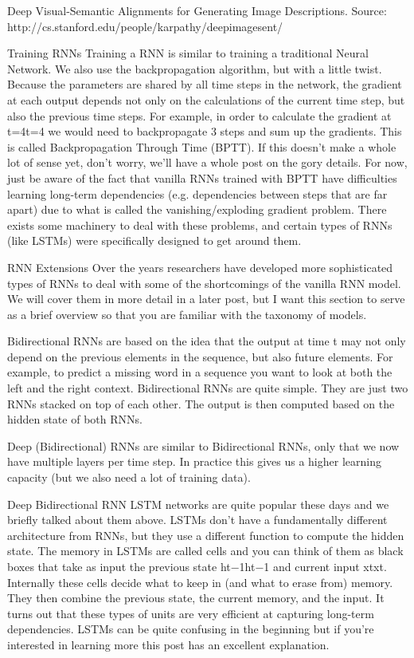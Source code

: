 Deep Visual-Semantic Alignments for Generating Image Descriptions. Source: http://cs.stanford.edu/people/karpathy/deepimagesent/

Training RNNs
Training a RNN is similar to training a traditional Neural Network. We also use the backpropagation algorithm, but with a little twist. Because the parameters are shared by all time steps in the network, the gradient at each output depends not only on the calculations of the current time step, but also the previous time steps. For example, in order to calculate the gradient at t=4t=4 we would need to backpropagate 3 steps and sum up the gradients. This is called Backpropagation Through Time (BPTT). If this doesn’t make a whole lot of sense yet, don’t worry, we’ll have a whole post on the gory details. For now, just be aware of the fact that vanilla RNNs trained with BPTT have difficulties learning long-term dependencies (e.g. dependencies between steps that are far apart) due to what is called the vanishing/exploding gradient problem. There exists some machinery to deal with these problems, and certain types of RNNs (like LSTMs) were specifically designed to get around them.

RNN Extensions
Over the years researchers have developed more sophisticated types of RNNs to deal with some of the shortcomings of the vanilla RNN model. We will cover them in more detail in a later post, but I want this section to serve as a brief overview so that you are familiar with the taxonomy of models.

Bidirectional RNNs are based on the idea that the output at time t may not only depend on the previous elements in the sequence, but also future elements. For example, to predict a missing word in a sequence you want to look at both the left and the right context. Bidirectional RNNs are quite simple. They are just two RNNs stacked on top of each other. The output is then computed based on the hidden state of both RNNs.

Deep (Bidirectional) RNNs are similar to Bidirectional RNNs, only that we now have multiple layers per time step. In practice this gives us a higher learning capacity (but we also need a lot of training data).

Deep Bidirectional RNN LSTM networks are quite popular these days and we briefly talked about them above. LSTMs don’t have a fundamentally different architecture from RNNs, but they use a different function to compute the hidden state. The memory in LSTMs are called cells and you can think of them as black boxes that take as input the previous state ht−1ht−1 and current input xtxt. Internally these cells decide what to keep in (and what to erase from) memory. They then combine the previous state, the current memory, and the input. It turns out that these types of units are very efficient at capturing long-term dependencies. LSTMs can be quite confusing in the beginning but if you’re interested in learning more this post has an excellent explanation.

